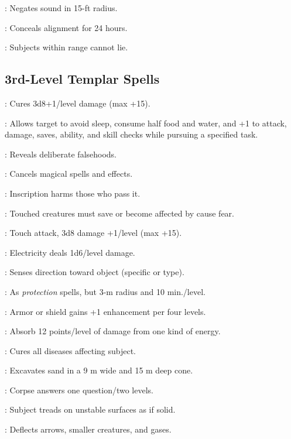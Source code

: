 : Negates sound in 15-ft radius.

: Conceals alignment for 24 hours.

: Subjects within range cannot lie.



\subsection{3rd-Level Templar Spells}

: Cures 3d8+1/level damage (max +15).

: Allows target to avoid sleep, consume half food and water, and +1 to attack, damage, saves, ability, and skill checks while pursuing a specified task.

: Reveals deliberate falsehoods.

: Cancels magical spells and effects.

: Inscription harms those who pass it.

: Touched creatures must save or become affected by cause fear.

: Touch attack, 3d8 damage +1/level (max +15).

: Electricity deals 1d6/level damage.

: Senses direction toward object (specific or type).

: As \emph{protection} spells, but 3-m radius and 10 min./level.

: Armor or shield gains +1 enhancement per four levels.

: Absorb 12 points/level of damage from one kind of energy.

: Cures all diseases affecting subject.

: Excavates sand in a 9 m wide and 15 m deep cone.

: Corpse answers one question/two levels.

: Subject treads on unstable surfaces as if solid.

: Deflects arrows, smaller creatures, and gases.


